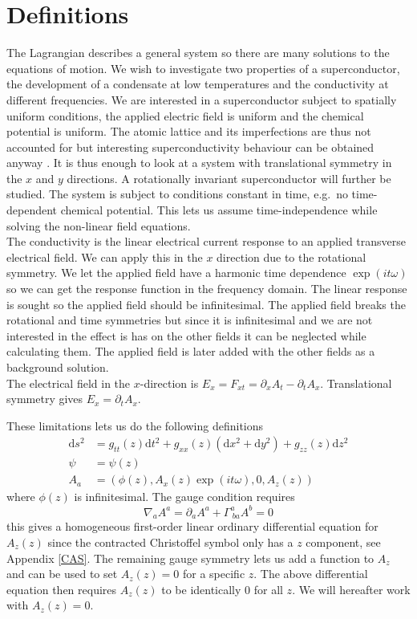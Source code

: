 \documentclass[12pt]{report}
\renewcommand{\d}{\ensuremath{\mathrm{d}}}
\renewcommand{\i}{\ensuremath{i}}
\newcommand{\At}{\ensuremath{{\phi}}}
\begin{document}
\section{Definitions}
The Lagrangian describes a general system so there are many solutions to the equations of motion. We wish to investigate two properties of a superconductor, the development of a condensate at low temperatures and the conductivity at different frequencies. We are interested in a superconductor subject to spatially uniform conditions, the applied electric field is uniform and the chemical potential is uniform. The atomic lattice and its imperfections are thus not accounted for but interesting superconductivity behaviour can be obtained anyway \cite{hartnoll9}. It is thus enough to look at a system with translational symmetry in the $x$ and $y$ directions. A rotationally invariant superconductor will further be studied. The system is subject to conditions constant in time, e.g.~no time-dependent chemical potential. This lets us assume time-independence while solving the non-linear field equations.\\

The conductivity is the linear electrical current response to an applied transverse electrical field. We can apply this in the $x$ direction due to the rotational symmetry. We let the applied field have a harmonic time dependence $\exp(\i t \omega)$ so we can get the response function in the frequency domain. The linear response is sought so the applied field should be infinitesimal. The applied field breaks the rotational and time symmetries but since it is infinitesimal and we are not interested in the effect is has on the other fields it can be neglected while calculating them. The applied field is later added with the other fields as a background solution.\\
The electrical field in the $x$-direction is $E_x=F_{xt}=\partial_xA_t-\partial_tA_x$. Translational symmetry gives $E_x=\partial_tA_x$.

These limitations lets us do the following definitions
\begin{equation}
 \begin{split}
  \d s^2&=g_{tt}(z)\d t^2+g_{xx}(z)(\d x^2+\d y^2)+g_{zz}(z)\d z^2  \\
  \psi&=\psi(z)\\
  A_a&=(\At(z), A_x(z)\exp(\i t \omega), 0, A_z(z))
 \end{split}\label{defs}
\end{equation}
where $\At(z)$ is infinitesimal.
The gauge condition requires
\begin{equation}
 \nabla_aA^a=\partial_aA^a+\Gamma^a_{\ ba}A^b=0
\end{equation}
this gives a homogeneous first-order linear ordinary differential equation for $A_z(z)$ since the contracted Christoffel symbol only has a $z$ component, see Appendix \ref{CAS}. The remaining gauge symmetry lets us add a function to $A_z$ and can be used to set $A_z(z)=0$ for a specific $z$. The above differential equation then requires $A_z(z)$ to be identically 0 for all $z$. We will hereafter work with $A_z(z)=0$.\\
\end{document}
